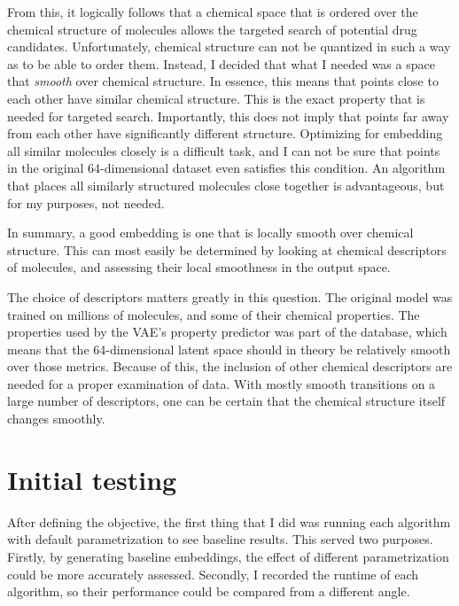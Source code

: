 From this, it logically follows that a chemical space that is ordered over the chemical structure of molecules allows the targeted search of potential drug candidates. Unfortunately, chemical structure can not be quantized in such a way as to be able to order them. Instead, I decided that what I needed was a space that \textit{smooth} over chemical structure. In essence, this means that points close to each other have similar chemical structure. This is the exact property that is needed for targeted search. Importantly, this does not imply that points far away from each other have significantly different structure. Optimizing for embedding all similar molecules closely is a difficult task, and I can not be sure that points in the original 64-dimensional dataset even satisfies this condition. An algorithm that places all similarly structured molecules close together is advantageous, but for my purposes, not needed.

In summary, a good embedding is one that is locally smooth over chemical structure. This can most easily be determined by looking at chemical descriptors of molecules, and assessing their local smoothness in the output space.

The choice of descriptors matters greatly in this question. The original model was trained on millions of molecules, and some of their chemical properties. The properties used by the VAE's property predictor was part of the database, which means that the 64-dimensional latent space should in theory be relatively smooth over those metrics. Because of this, the inclusion of other chemical descriptors are needed for a proper examination of data. With mostly smooth transitions on a large number of descriptors, one can be certain that the chemical structure itself changes smoothly.

\section{Initial testing}\label{sec:initial-testing}

After defining the objective, the first thing that I did was running each algorithm with default parametrization to see baseline results. This served two purposes. Firstly, by generating baseline embeddings, the effect of different parametrization could be more accurately assessed. Secondly, I recorded the runtime of each algorithm, so their performance could be compared from a different angle.

